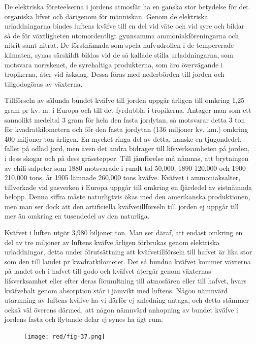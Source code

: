 \documentclass[a4paper, 12pt, oneside, swedish]{article}
\begin{document}
De elektriska företeelserna i jordens atmosfär ha en ganska stor betydelse för det organiska lifvet och därigenom för människan. Genom de elektriska urladdningarna bindes luftens kväfve till en del vid väte och vid syre och bildar så de för växtligheten utomordentligt gynnsamma ammoniakföreningarna och nitrit samt nitrat. De förstnämnda som spela hufvudrollen i de tempererade klimaten, synas särskildt bildas vid de så kallade stilla urladdningarna, som motsvara norrskenet, de syrehaltiga produkterna, som äro övervägande i tropikerna, åter vid åskslag. Dessa föras med nederbörden till jorden och tillgodogöras av växterna.

Tillförseln av sålunda bundet kväfve till jorden uppgår årligen till omkring 1,25 gram pr kv. m. i Europa och till det fyrdubbla i tropikerna. Antager man som ett sannolikt medeltal 3 gram för hela den fasta jordytan, så motsvarar detta 3 ton för kvadratkilometern och för den fasta jordytan (136 miljoner kv. km.) omkring 400 miljoner ton årligen. En mycket ringa del av detta, kanske en tjugondedel, faller på odlad jord, men även det andra bidrager till lifsverksamheten på jorden, i dess skogar och på dess grässtepper. Till jämförelse må nämnas, att brytningen av chili-salpeter som 1880 motsvarade i rundt tal 50,000, 1890 120,000 och 1900 210,000 tons, år 1905 lämnade 260,000 tons kväfve. Kväfvet i ammoniaksalter, tillverkade vid gasverken i Europa uppgår till omkring en fjärdedel av sistnämnda belopp. Denna siffra måste naturligtvis ökas med den amerikanska produktionen, men man ser dock att den artificiella kväfvetillförseln till jorden ej uppgår till mer än omkring en tusendedel av den naturliga.

Kväfvet i luften utgör 3,980 biljoner ton. Man ser däraf, att endast omkring en del av tre miljoner av luftens kväfve årligen förbrukas genom elektriska urladdningar, detta under förutsättning att kväfvetillförseln till hafvet är lika stor som den till landet pr kvadratkilometer. Det så bundna kväfvet kommer växterna på landet och i hafvet till godo och kväfvet återgår genom växternas lifsverksamhet eller efter deras förmultning till atmosfären eller till hafvet, hvars kväfvehalt genom absorption står i jämvikt med luftens. Någon nämnvärd utarmning av luftens kväfve ha vi därför ej anledning antaga, och detta stämmer också väl överens därmed, att någon nämnvärd anhopning av bundet kväfve i jordens fasta och flytande delar ej synes ha ägt rum.

\begin{figure}[H]
\centering
\texttt{[image: red/fig-37.png]}
\caption{}
\end{figure}
\end{document}

